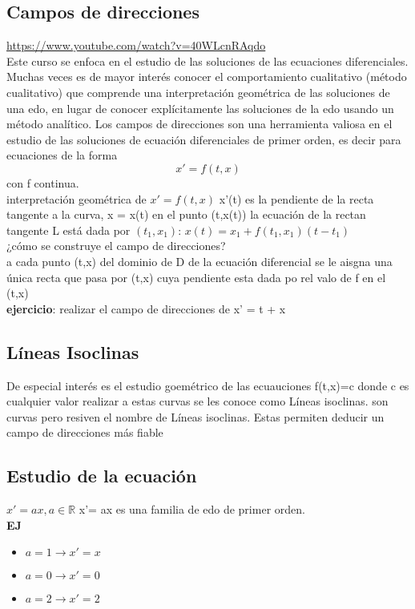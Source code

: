 \documentclass{book}
\begin{document}
    \subsection{Campos de direcciones}
    \url{https://www.youtube.com/watch?v=40WLcnRAqdo}\\ 
    Este curso se enfoca en el estudio de las soluciones de las ecuaciones
    diferenciales.
    Muchas veces es de mayor interés conocer el comportamiento cualitativo
    (método cualitativo) que comprende una interpretación geométrica de las
    soluciones de una edo, en lugar de conocer explícitamente las soluciones
    de la edo usando un método analítico.
    Los campos de direcciones son una herramienta valiosa en el estudio de
    las soluciones de ecuación diferenciales de primer orden, es decir para
    ecuaciones de la forma
    \begin{equation*}
        x'=f(t,x)
    \end{equation*}
    con f continua.\\ 
    interpretación geométrica de $x'=f(t,x)$
    x'(t) es la pendiente de la recta tangente a la curva, x = x(t) en el punto (t,x(t))
    la ecuación de la rectan tangente L está dada por $(t_{1},x_{1})$: $x(t)=x_{1}+f(t_{1},x_{1})(t-t_{1})$\\ 
    ¿cómo se construye el campo de direcciones? 
    \\ a cada punto (t,x) del dominio de D de la ecuación diferencial se le aisgna una única recta que pasa por 
    (t,x) cuya pendiente esta dada po rel valo de f en el (t,x)
    \\ 
    \textbf{ejercicio}: realizar el campo de direcciones de x' = t + x\\ 
    \subsection{Líneas Isoclinas}
    De especial interés es el estudio goemétrico de las ecuauciones f(t,x)=c donde c es cualquier valor realizar
    a estas curvas se les conoce como Líneas isoclinas. son curvas pero resiven el nombre de Líneas isoclinas.
    Estas permiten deducir un campo de direcciones más fiable
    \subsection{Estudio de la ecuación}
    \textbf{$x'=ax, a \in \mathbb{R}$} x'= ax es una familia de edo de primer orden.
    \\ 
    \textbf{EJ}
    \begin{itemize}
        \item $a = 1\to x'=x$
        \item $a = 0\to x'=0$
        \item $a = 2\to x'=2$
    \end{itemize}
\end{document}
